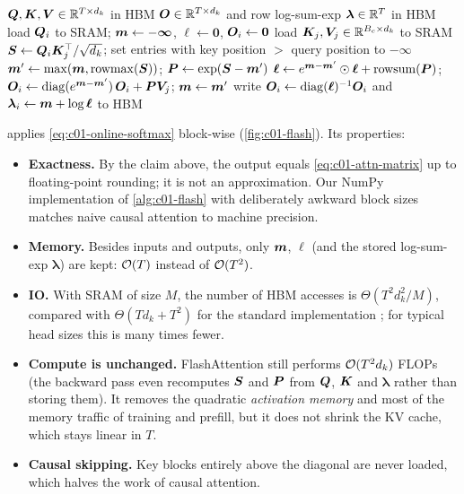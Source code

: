 \begin{algorithm}[t]
\caption{FlashAttention forward pass for one head (causal), with row block $B_r$ and column block $B_c$.}\label{alg:c01-flash}
\begin{algorithmic}[1]
\Require $\bm{Q}, \bm{K}, \bm{V} \in \mathbb{R}^{T\times d_k}$ in HBM
\Ensure $\bm{O} \in \mathbb{R}^{T\times d_k}$ and row log-sum-exp $\bm{\lambda} \in \mathbb{R}^{T}$ in HBM
 
  \State load $\bm{Q}_i$ to SRAM; $\bm{m} \gets -\bm{\infty}$, $\bm{\ell} \gets \bm{0}$, $\bm{O}_i \gets \bm{0}$ 
    \State load $\bm{K}_j, \bm{V}_j \in \mathbb{R}^{B_c\times d_k}$ to SRAM
    \State $\bm{S} \gets \bm{Q}_i\bm{K}_j^{\top}/\sqrt{d_k}$; set entries with key position $>$ query position to $-\infty$
    \State $\bm{m}' \gets \max(\bm{m}, \mathrm{rowmax}(\bm{S}))$; \quad $\bm{P} \gets \exp(\bm{S} - \bm{m}')$ 
    \State $\bm{\ell} \gets e^{\bm{m} - \bm{m}'}\odot\bm{\ell} + \mathrm{rowsum}(\bm{P})$; \quad $\bm{O}_i \gets \operatorname{diag}(e^{\bm{m} - \bm{m}'})\,\bm{O}_i + \bm{P}\bm{V}_j$; \quad $\bm{m} \gets \bm{m}'$
  \EndFor
  \State write $\bm{O}_i \gets \operatorname{diag}(\bm{\ell})^{-1}\bm{O}_i$ and $\bm{\lambda}_i \gets \bm{m} + \log\bm{\ell}$ to HBM
\EndFor
\end{algorithmic}
\end{algorithm}

 applies \eqref{eq:c01-online-softmax} block-wise
(\cref{fig:c01-flash}). Its properties:
\begin{itemize}
  \item \textbf{Exactness.} By the claim above, the output equals \eqref{eq:c01-attn-matrix}
  up to floating-point rounding; it is not an approximation. Our NumPy implementation of
  \cref{alg:c01-flash} with deliberately awkward block sizes matches naive causal attention to
  machine precision.
  \item \textbf{Memory.} Besides inputs and outputs, only $\bm{m}$, $\bm{\ell}$ (and the stored
  log-sum-exp $\bm{\lambda}$) are kept: $\mathcal{O}(T)$ instead of $\mathcal{O}(T^2)$.
  \item \textbf{IO.} With SRAM of size $M$, the number of HBM accesses is
  $\Theta(T^2d_k^2/M)$, compared with $\Theta(Td_k + T^2)$ for the standard implementation
  \citep{c01-dao2022flashattention}; for typical head sizes this is many times fewer.
  \item \textbf{Compute is unchanged.} FlashAttention still performs $\mathcal{O}(T^2d_k)$ FLOPs (the
  backward pass even recomputes $\bm{S}$ and $\bm{P}$ from $\bm{Q}$, $\bm{K}$ and $\bm{\lambda}$ rather
  than storing them). It removes the quadratic \emph{activation memory} and most of the
  memory traffic of training and prefill, but it does not shrink the KV cache, which stays
  linear in $T$.
  \item \textbf{Causal skipping.} Key blocks entirely above the diagonal are never loaded,
  which halves the work of causal attention.
\end{itemize}


